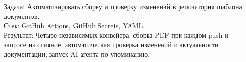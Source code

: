 \item {}
    Задача: Автоматизировать сборку и проверку изменений в репозитории шаблона документов.\\
    Стек: GitHub Actions, GitHub Secrets, YAML.\\
    Результат: Четыре независимых конвейера: сборка PDF при каждом push и запросе на слияние, автоматическая проверка изменений и актуальности документации, запуск AI-агента по упоминанию.
